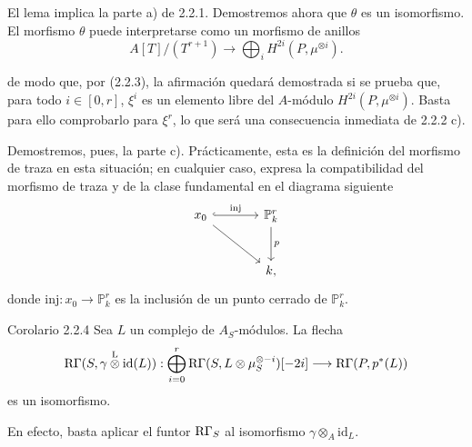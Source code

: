 El lema implica la parte a) de 2.2.1. Demostremos ahora que $\theta$ es un isomorfismo. El morfismo $\theta$ puede interpretarse como un morfismo de anillos
\[
A[T]/(T^{r+1})\longrightarrow\bigoplus_i H^{2i}(P,\mu^{\otimes i}).
\]


de modo que, por (2.2.3), la afirmación quedará demostrada si se prueba que, para todo $i\in[0,r]$, $\xi^i$ es un elemento libre del $A$-módulo $H^{2i}(P,\mu^{\otimes i})$. Basta para ello comprobarlo para $\xi^r$, lo que será una consecuencia inmediata de 2.2.2 c).

Demostremos, pues, la parte c). Prácticamente, esta es la definición del morfismo de traza en esta situación; en cualquier caso, expresa la compatibilidad del morfismo de traza y de la clase fundamental en el diagrama siguiente
\[
\begin{tikzcd}[column sep=large,row sep=large]
x_0 \arrow[r,hook,"\mathrm{inj}"] \arrow[dr] & \mathbb P^r_k \arrow[d,"p"]\\
& k ,
\end{tikzcd}
\]
donde $\mathrm{inj}:x_0\to \mathbb P^r_k$ es la inclusión de un punto cerrado de $\mathbb P^r_k$.

\begin{statement}{Corolario 2.2.4}
Sea $L$ un complejo de $A_S$-módulos. La flecha
\[
\mathrm{R}\Gamma(S,\gamma\overset{\mathrm L}{\otimes}\mathrm{id}(L)):
\bigoplus_{i=0}^r \mathrm{R}\Gamma(S,L\otimes\mu_S^{\otimes -i})[-2i]
\longrightarrow
\mathrm{R}\Gamma(P,p^*(L))
\]
es un isomorfismo.
\end{statement}

En efecto, basta aplicar el funtor $\mathrm{R}\Gamma_S$ al isomorfismo $\gamma\otimes_A\mathrm{id}_L$.
